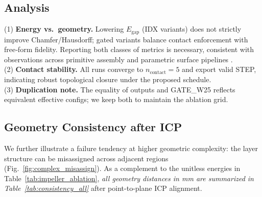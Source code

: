 \documentclass{ieeeaccess}
\begin{document}
\subsection{Analysis}
(1) \textbf{Energy vs.\ geometry.} Lowering $E_{\text{gap}}$ (IDX variants) does not strictly improve Chamfer/Hausdorff; gated variants balance contact enforcement with free‑form fidelity. Reporting both classes of metrics is necessary, consistent with observations across primitive assembly and parametric surface pipelines \cite{b14,b19,b22}.\\
(2) \textbf{Contact stability.} All runs converge to $n_{\text{contact}}{=}5$ and export valid STEP, indicating robust topological closure under the proposed schedule.\\
(3) \textbf{Duplication note.} The equality of outputs and GATE\_W25 reflects equivalent effective configs; we keep both to maintain the ablation grid.

\subsection{Geometry Consistency after ICP}
We further illustrate a failure tendency at higher geometric complexity: the
layer structure can be misassigned across adjacent regions
(Fig.~\ref{fig:complex_misassign}). As a complement to the unitless
energies in Table~\ref{tab:impeller_ablation}, 
\emph{all geometry distances in mm are summarized in
Table~\ref{tab:consistency_all}} after point-to-plane ICP alignment.
\end{document}
